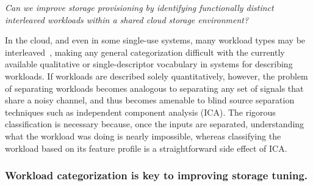 

\textit{Can we improve storage provisioning by identifying functionally distinct
interleaved workloads within a shared cloud storage environment?}
       
                In the cloud, and even in some single-use systems, many workload
                types may be interleaved~\cite{TK}, making any general categorization
                difficult with the currently available qualitative or
                single-descriptor vocabulary in systems for describing
                workloads. If workloads are described solely quantitatively,
                however, the problem of separating workloads becomes analogous
                to separating any set of signals that share a noisy channel, and
                thus becomes amenable to blind source separation techniques such
                as independent component analysis (ICA). The rigorous
                classification is necessary because, once the inputs are
                separated, understanding what the workload was doing is nearly
                impossible, whereas classifying the workload based on its
                feature profile is a straightforward side effect of ICA.
                  

\subsubsection*{Workload categorization is key to improving storage tuning. }


